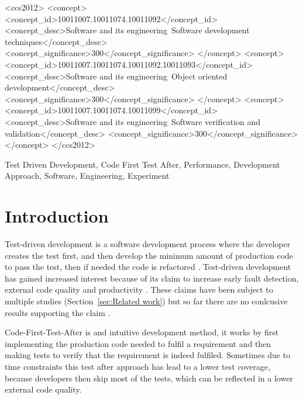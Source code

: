 \documentclass{sig-alternate-05-2015}
\begin{document}
%
%
\begin{CCSXML}
<ccs2012>
<concept>
<concept_id>10011007.10011074.10011092</concept_id>
<concept_desc>Software and its engineering~Software development techniques</concept_desc>
<concept_significance>300</concept_significance>
</concept>
<concept>
<concept_id>10011007.10011074.10011092.10011093</concept_id>
<concept_desc>Software and its engineering~Object oriented development</concept_desc>
<concept_significance>300</concept_significance>
</concept>
<concept>
<concept_id>10011007.10011074.10011099</concept_id>
<concept_desc>Software and its engineering~Software verification and validation</concept_desc>
<concept_significance>300</concept_significance>
</concept>
</ccs2012>
\end{CCSXML}



%
%

%
%
\printccsdesc

\begin{keywords}
Test Driven Development, Code First Test After, Performance, Development Approach, Software, Engineering, \newline Experiment
\end{keywords}

\section{Introduction}
Test-driven development is a software development process where the developer creates the test first, and then develop the minimum amount of production code to pass the test, then if needed the code is refactored \cite{beck1}. Test-driven development has gained increased interest because of its claim to increase early fault detection, external code quality and productivity \cite{astels1}. These claims have been subject to multiple studies (Section~\ref{sec:Related work}) but so far there are no conlcusive results supporting the claim \cite{shull1}.

Code-First-Test-After is and intuitive development method, it works by first implementing the production code needed to fulfil a requirement and then making tests to verify that the requirement is indeed fulfiled. Sometimes due to time constraints this test after approach has lead to a lower test coverage, because developers then skip most of the tests, which can be reflected in a lower external code quality.
\end{document}
